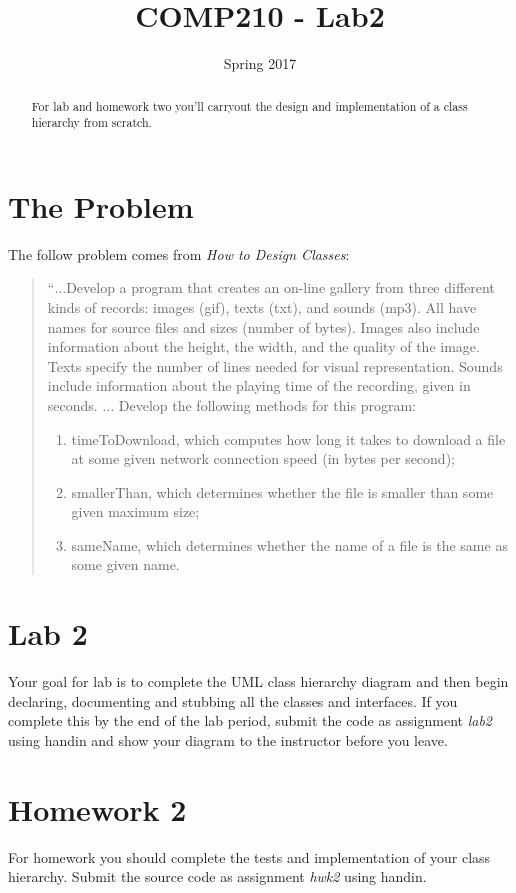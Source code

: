 \documentclass[]{tufte-handout}
\title{COMP210 - Lab2}
\author{}
\date{ Spring 2017 }
\begin{document}
\maketitle

\begin{abstract}
For lab and homework two you'll carryout the design and implementation of a class hierarchy from scratch.
\end{abstract}

\section{The Problem}

The follow problem comes from \textit{How to Design Classes}:
\begin{quote}
``$\ldots$Develop a program that creates an on-line gallery from three
different kinds of records: images (gif), texts (txt), and sounds
(mp3). All have names for source files and sizes (number of
bytes). Images also include information about the height, the
width, and the quality of the image. Texts specify the number of
lines needed for visual representation. Sounds include information
about the playing time of the recording, given in seconds.
$\ldots$
Develop the following methods for this program:
\begin{enumerate}
\item timeToDownload, which computes how long it takes to download a file
at some given network connection speed (in bytes per second);
\item smallerThan, which determines whether the file is smaller than some
given maximum size;
\item sameName, which determines whether the name of a file is the same
as some given name.
\end{enumerate}
\end{quote}

\section{Lab 2}

Your goal for lab is to complete the UML class hierarchy diagram and then begin declaring, documenting and stubbing all the classes and interfaces. If you complete this by the end of the lab period, submit the code as assignment \textit{lab2} using handin and show your diagram to the instructor before you leave.

\section{Homework 2}

For homework you should complete the tests and implementation of your class hierarchy.  Submit the source code as assignment \textit{hwk2} using handin.
\end{document}
